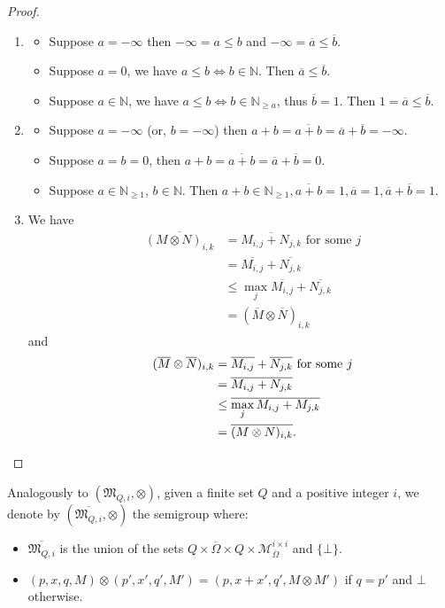\documentclass{lmcs}
\theoremstyle{remark}
\newcommand{\N}{\mathbb{N}}
\newcommand{\ideal}{\mathfrak{M}}
\newcommand{\matricesOmbar}[2]{\mathcal{M}_{\overline{\Omega}}^{#1\times #2}}
\theoremstyle{remark}
\begin{document}
\begin{proof}\hfill
\begin{enumerate}[label={\normalfont(\arabic*)}]
\item
\begin{itemize}
\item Suppose $a = -\infty$ then $-\infty  = a\le b$ and $-\infty=\overline{a}\le \overline{b}$.
\item Suppose $a= 0$, we have $a\le b \iff b\in\N$. Then $\overline{a} \le \overline{b}$. 
\item Suppose $a\in \N$, we have $a\le b \iff b\in \N_{\ge a}$, thus $\overline{b} = 1$. Then $1 = \overline{a} \le \overline{b}$.
\end{itemize}
\item
\begin{itemize}
\item  Suppose $a=-\infty$ (or, $b = -\infty$) then $a+b = \overline{a+b} = \overline{a} + \overline{b} = -\infty$.
\item Suppose $a=b=0$, then $a+ b= \overline{a+b} = \overline{a} + \overline{b} = 0$.
\item Suppose $a\in \mathbb{N}_{\ge 1}$, $b\in\N$. Then $a+b \in \mathbb{N}_{\ge 1}, \overline{a+b} = 1, \overline{a} = 1, \overline{a} + \overline{b} = 1$.
\end{itemize}
    \item We have \begin{align*}\qquad\overline{(M\otimes N)_{i,k}} &= \overline{M_{i,j} + N_{j,k}} \text{ for some } j
     \\&= \overline{M_{i,j}} + \overline{N_{j,k}} 
     \\&\le \max_{j}  \overline{M_{i,j}} + \overline{N_{j,k}}  
     \\&= (\overline{M}\otimes\overline{N})_{i,k}\end{align*}
    and
    \begin{align*}\qquad(\overline{M}\otimes\overline{N})_{i,k} &=  \overline{M_{i,j}} + \overline{N_{j,k}}  \text{ for some } j
    \\&= \overline{M_{i,j} + N_{j,k}}  
    \\&\le \overline{\max_{j} M_{i,j} + M_{j,k}} 
    \\&= \overline{(M\otimes N)_{i,k}}.\qedhere\end{align*}
\end{enumerate}
\end{proof}

Analogously to $(\ideal_{Q,i}, \otimes)$, given a finite set $Q$ and a positive integer $i$, we denote by $(\overline{\ideal_{Q,i}}, \otimes)$ the semigroup where:
\begin{itemize}
\item $\overline{\ideal_{Q,i}}$ is the union of the sets $Q \times \overline{\Omega} \times Q \times \matricesOmbar{i}{i}$ and $\{\bot\}$.
\item $(p,x,q,M)\otimes(p',x',q',M') = (p,x + x',q', M\otimes M')$ if $q = p'$ and $\bot$ otherwise.
\end{itemize}
\end{document}
